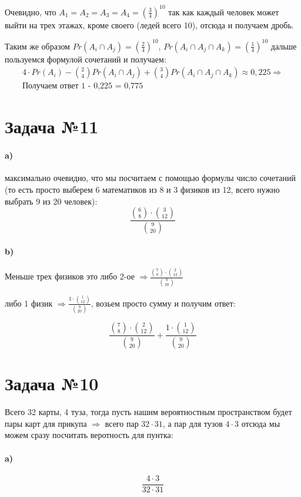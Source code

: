 \documentclass[a4paper, 12pt]{article} %
\begin{document}
Очевидно, что $A_{1} = A_{2} = A_{3} = A_{4} = {(\frac{3}{4})}^{10}$ так как каждый человек может выйти на трех этажах, кроме своего
(ледей всего 10),
 отсюда и получаем дробь.

 Таким же образом $Pr(A_{i} \cap A_{j}) = {(\frac{2}{4})}^{10}$, $Pr(A_{i} \cap A_{j} \cap A_{k}) = {(\frac{1}{4})}^{10}$
дальше пользуемся формулой сочетаний и получаем:
\begin{align} 
     4 \cdot Pr(A_{i}) - {2 \choose 4}Pr(A_{i} \cap A_{j}) + {3 \choose 4}Pr(A_{i} \cap A_{j} \cap A_{k}) \approx 0,225 \Rightarrow \\
     \text{Получаем ответ 1 - 0,225 = 0,775}
\end{align}

\section*{Задача №11}
\paragraph*{a)}
максимально очевидно, что мы посчитаем с помощью формулы число сочетаний (то есть просто выберем 6 математиков 
из 8 и 3 физиков из 12, всего нужно выбрать 9 из 20 человек):
\[
    \frac{{6 \choose 8} \cdot {3 \choose 12}}{{9 \choose 20}}
\]
\paragraph*{b)}
Меньше трех физиков это либо 2-ое $\Rightarrow \frac{{7 \choose 8} \cdot {2 \choose 12}}{{9 \choose 20}}$

либо 1 физик $\Rightarrow \frac{1 \cdot {1 \choose 12}}{{9 \choose 20}}$, возьем просто сумму и получим ответ:

\[
    \frac{{7 \choose 8} \cdot {2 \choose 12}}{{9 \choose 20}} + \frac{1 \cdot {1 \choose 12}}{{9 \choose 20}}
\]

\section*{Задача №10}

Всего 32 карты, 4 туза, тогда пусть нашим вероятностным пространством
будет пары карт для прикупа $\Rightarrow$ всего пар $32 \cdot 31$, а пар для тузов $4 \cdot 3$ отсюда мы можем сразу посчитать веротность для пунтка:
\paragraph*{a)}
\[ \frac{4 \cdot 3}{32 \cdot 31}
    \]
\end{document}
